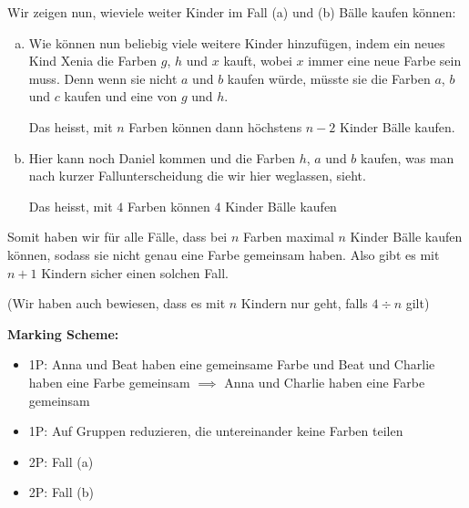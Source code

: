 Wir zeigen nun, wieviele weiter Kinder im Fall (a) und (b) Bälle kaufen können:
\begin{enumerate}[(a)]
\item Wie können nun beliebig viele weitere Kinder hinzufügen, indem ein neues Kind Xenia die Farben $g$, $h$ und $x$ kauft, wobei $x$ immer eine neue Farbe sein muss. Denn wenn sie nicht $a$ und $b$ kaufen würde, müsste sie die Farben $a$, $b$ und $c$ kaufen und eine von $g$ und $h$. 

Das heisst, mit $n$ Farben können dann höchstens $n-2$ Kinder Bälle kaufen.

\item Hier kann noch Daniel kommen und die Farben $h$, $a$ und $b$ kaufen, was man nach kurzer Fallunterscheidung die wir hier weglassen, sieht.

Das heisst, mit $4$ Farben können $4$ Kinder Bälle kaufen
\end{enumerate}

Somit haben wir für alle Fälle, dass bei $n$ Farben maximal $n$ Kinder Bälle kaufen können, sodass sie nicht genau eine Farbe gemeinsam haben. Also gibt es mit $n+1$ Kindern sicher einen solchen Fall.

(Wir haben auch bewiesen, dass es mit $n$ Kindern nur geht, falls $ 4 \div n$ gilt)

\textbf{Marking Scheme:}
\begin{itemize}
    \item 1P: Anna und Beat haben eine gemeinsame Farbe und Beat und Charlie haben eine Farbe gemeinsam $\implies$ Anna und Charlie haben eine Farbe gemeinsam
    \item 1P: Auf Gruppen reduzieren, die untereinander keine Farben teilen
    \item 2P: Fall (a)
    \item 2P: Fall (b)
\end{itemize}